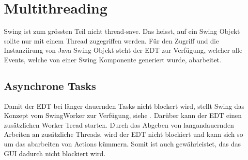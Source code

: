   \section{Multithreading}
  
  Swing ist zum grössten Teil nicht thread-save. Das heisst, auf ein Swing
  Objekt sollte nur mit einem Thread zugegriffen werden. Für den Zugriff und
  die Instanziirung von Java Swing Objekt steht der \ac{EDT} zur Verfügung,
  welcher alle Events, welche von einer Swing Komponente generiert wurde,
  abarbeitet.
  
  \subsection{Asynchrone Tasks}
  
  Damit der \ac{EDT} bei länger dauernden Tasks nicht blockert wird, stellt
  Swing das Konzept vom SwingWorker zur Verfügung, siehe \cite{SwingWorker}.
  Darüber kann der \ac{EDT} einen zusätzlichen Worker Tread starten. Durch das
  Abgeben von langandauernden Arbeiten an zusätzliche Threads, wird der
  \ac{EDT} nicht blockiert und kann sich so um das abarbeiten von Actions
  kümmern. Somit ist auch gewährleistet, das das \ac{GUI} dadurch nicht
  blockiert wird.
